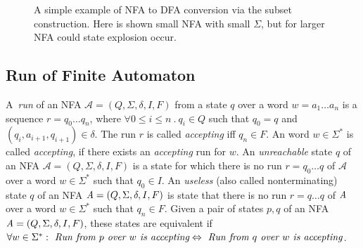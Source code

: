 \begin{figure}[h]
\begin{center}
\end{center}
	\caption{A simple example of NFA to DFA conversion via the subset construction. 
    Here is shown small NFA with small $\Sigma$, but for larger NFA could state explosion occur.}
    \label{pic_sub}
	\end{figure}



	\subsection{Run of Finite Automaton}
	\label{defRun}
  A~\emph{run} of an NFA $\mathcal{A}=(Q,\Sigma,\delta,I,F)$ from a state $q$
  over a word $w=a_1\ldots a_n$ is a sequence $r = q_0 \ldots q_n$, where $\forall 0\leq i \leq n\ .\ q_i\in Q$ 
  such that $q_0=q$ and $(q_i,a_{i+1},q_{i+1})\in \delta$. 
  The run $r$ is called \emph{accepting} iff $q_n \in F$. 
	An word $w \in \Sigma^{*}$ is called \emph{accepting}, if there exists an \emph{accepting} run for $w$.
  An \emph{unreachable} state $q$ of an NFA $\mathcal{A}=(Q,\Sigma,\delta,I,F)$ is a state for which there is no run $r=q_0\ldots q$ of 
  $\mathcal{A}$ over a word $w \in \Sigma^{*}$ 
  such that $q_0\in I$.
  An \emph{useless} (also called nonterminating) state $q$ of an NFA $\emph{A}=(Q,\Sigma,\delta,I,F)$ is state that there is no run $r=q\ldots q$ 
  of $\emph{A}$ over a word
  $w \in \Sigma^{*}$ such that $q_n \in F$.
  Given a pair of states $p,q$ of an NFA $\emph{A}=(Q,\Sigma,\delta,I,F)$, these states are equivalent if 
  $\forall w \in \Sigma^{*}: \emph{ Run from } p \emph{ over } w \emph{ is accepting} \Leftrightarrow 
			\emph{ Run from } q \emph{ over } w \emph{ is accepting}$.

